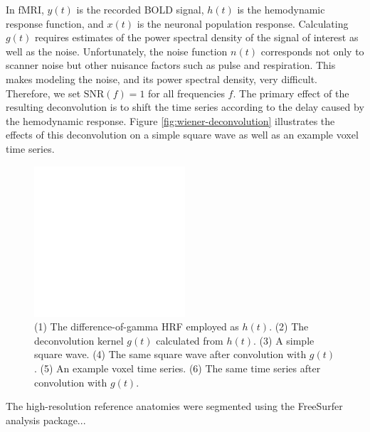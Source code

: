 \documentclass[final]{article}
\begin{document}
In fMRI, $y(t)$ is the recorded BOLD signal, $h(t)$ is the hemodynamic response function, and $x(t)$ is the neuronal population response.
Calculating $g(t)$ requires estimates of the power spectral density of the signal of interest as well as the noise.
Unfortunately, the noise function $n(t)$ corresponds not only to scanner noise but other nuisance factors such as pulse and respiration.
This makes modeling the noise, and its power spectral density, very difficult.
Therefore, we set $\mbox{SNR}(f) = 1$ for all frequencies $f$.
The primary effect of the resulting deconvolution is to shift the time series according to the delay caused by the hemodynamic response.
Figure \ref{fig:wiener-deconvolution} illustrates the effects of this deconvolution on a simple square wave as well as an example voxel time series.

\begin{figure}[!htbp]
\centering
\includegraphics[width=0.5\textwidth]{figures/placeholder}
\caption{(1) The difference-of-gamma HRF employed as $h(t)$. (2) The deconvolution kernel $g(t)$ calculated from $h(t)$. (3) A simple square wave. (4) The same square wave after convolution with $g(t)$. (5) An example voxel time series. (6) The same time series after convolution with $g(t)$.}
\label{fig:data-split}
\end{figure}

The high-resolution reference anatomies were segmented using the FreeSurfer 
analysis package...
\end{document}
